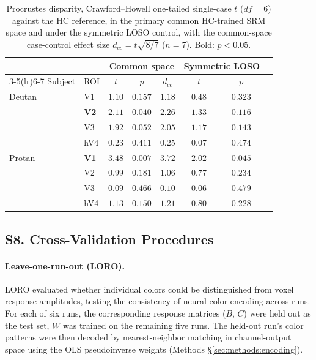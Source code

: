 \begin{table}[h]
\centering
\caption{Procrustes disparity, Crawford--Howell one-tailed single-case $t$ ($df = 6$) against the HC reference, in the primary common HC-trained SRM space and under the symmetric LOSO control, with the common-space case-control effect size $d_{cc} = t\sqrt{8/7}$ ($n = 7$). Bold: $p < 0.05$.}
\label{tab:disparity_loso}
\begin{tabular}{llcccccc}
\toprule
 & & \multicolumn{3}{c}{Common space} & \multicolumn{2}{c}{Symmetric LOSO} \\
\cmidrule(lr){3-5}\cmidrule(lr){6-7}
Subject & ROI & $t$ & $p$ & $d_{cc}$ & $t$ & $p$ \\
\midrule
Deutan & V1 & $1.10$ & $0.157$ & $1.18$ & $0.48$ & $0.323$ \\
 & \textbf{V2} & $\mathbf{2.11}$ & $\mathbf{0.040}$ & $2.26$ & $1.33$ & $0.116$ \\
 & V3 & $1.92$ & $0.052$ & $2.05$ & $1.17$ & $0.143$ \\
 & hV4 & $0.23$ & $0.411$ & $0.25$ & $0.07$ & $0.474$ \\
\midrule
Protan & \textbf{V1} & $\mathbf{3.48}$ & $\mathbf{0.007}$ & $3.72$ & $\mathbf{2.02}$ & $\mathbf{0.045}$ \\
 & V2 & $0.99$ & $0.181$ & $1.06$ & $0.77$ & $0.234$ \\
 & V3 & $0.09$ & $0.466$ & $0.10$ & $0.06$ & $0.479$ \\
 & hV4 & $1.13$ & $0.150$ & $1.21$ & $0.80$ & $0.228$ \\
\bottomrule
\end{tabular}
\end{table}



\subsection*{\textbf{S8. Cross-Validation Procedures}}

\paragraph{Leave-one-run-out (LORO).}

LORO evaluated whether individual colors could be distinguished from voxel response amplitudes, testing the consistency of neural color encoding across runs.
For each of six runs, the corresponding response matrices ($B$, $C$) were held out as the test set, $W$ was trained on the remaining five runs.
The held-out run's color patterns were then decoded by nearest-neighbor matching in channel-output space using the OLS pseudoinverse weights (Methods \S\ref{sec:methods:encoding}).

